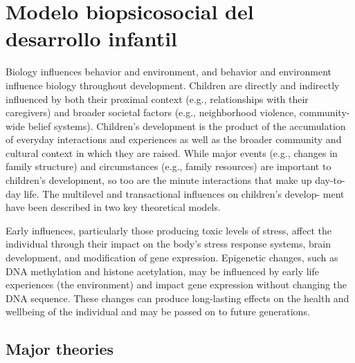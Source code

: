 \section{Modelo biopsicosocial del desarrollo infantil}
Biology influences behavior and environment, and behavior and environment
influence biology throughout development. Children are directly and indirectly
influenced by both their proximal context (e.g., relationships with their
caregivers) and broader societal factors (e.g., neighborhood violence,
community-wide belief systems). Children’s development is the product of the
accumulation of everyday interactions and experiences as well as the broader
community and cultural context in which they are raised. While major events
(e.g., changes in family structure) and circumstances (e.g., family resources)
are important to children’s development, so too are the minute interactions
that make up day-to-day life. The multilevel and transactional influences on
children’s develop- ment have been described in two key theoretical models.
\cite{Feldman3}

Early influences, particularly those producing toxic levels of stress, affect
the individual through their impact on the body’s stress response systems,
brain development, and modification of gene expression. Epigenetic changes,
such as DNA methylation and histone acetylation, may be influenced by early
life experiences (the environment) and impact gene expression without changing
the DNA sequence. These changes can produce long-lasting effects on the health
and wellbeing of the individual and may be passed on to future generations.
\cite{Nelson19}

\subsection{Major theories}

